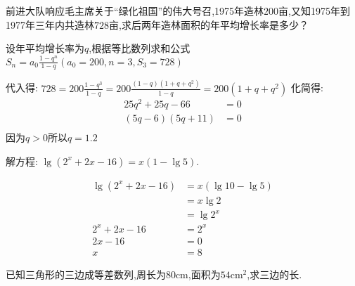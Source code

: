 \begin{questions}
\begin{solution}
	\end{solution}
	\question
	前进大队响应毛主席关于\enquote{绿化祖国}的伟大号召,1975年造林$200$亩,又知1975年到1977年三年内共造林$728$亩,求后两年造林面积的年平均增长率是多少？
	\begin{solution}
		设年平均增长率为$q$,根据等比数列求和公式
		\begin{math}
			S_n = a_0\frac{1-q^n}{1-q} (a_0 = 200, n = 3, S_3 = 728)
		\end{math}

		代入得:
		\begin{math}
			728 = 200 \frac{1-q^3}{1-q} = 200 \frac{(1-q)(1 + q + q^2)}{1-q} = 200(1 + q + q^2)
		\end{math}
		化简得:
		\begin{align*}
			25q^2 + 25q - 66  & = 0 \\
			(5q - 6)(5q + 11) & = 0 \\
		\end{align*}
		因为$q > 0$所以$q=1.2$
	\end{solution}

	\question 解方程:
	\begin{math}
		\lg(2^x + 2x - 16) = x(1-\lg5)
	\end{math}.
	\begin{solution}
		\begin{align*}
			\lg(2^x + 2x - 16) & = x(\lg10 - \lg5) \\
			                   & = x\lg2           \\
			                   & = \lg2^x          \\
			2^x + 2x - 16      & = 2^x             \\
			2x - 16            & = 0               \\
			x                  & = 8
		\end{align*}
	\end{solution}

	\question 已知三角形的三边成等差数列,周长为$80$cm,面积为$54$cm$^2$,求三边的长.
	\begin{solution}



\end{solution}
\end{questions}
